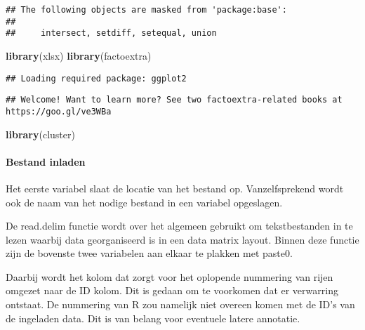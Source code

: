 \documentclass[
]{article}
\newenvironment{Shaded}{\begin{snugshade}}{\end{snugshade}}
\newcommand{\KeywordTok}[1]{\textcolor[rgb]{0.13,0.29,0.53}{\textbf{#1}}}
\newcommand{\NormalTok}[1]{#1}
\begin{document}
\begin{verbatim}
## The following objects are masked from 'package:base':
## 
##     intersect, setdiff, setequal, union
\end{verbatim}

\begin{Shaded}
\begin{Highlighting}[]
\KeywordTok{library}\NormalTok{(xlsx)}
\KeywordTok{library}\NormalTok{(factoextra)}
\end{Highlighting}
\end{Shaded}

\begin{verbatim}
## Loading required package: ggplot2
\end{verbatim}

\begin{verbatim}
## Welcome! Want to learn more? See two factoextra-related books at https://goo.gl/ve3WBa
\end{verbatim}

\begin{Shaded}
\begin{Highlighting}[]
\KeywordTok{library}\NormalTok{(cluster)}
\end{Highlighting}
\end{Shaded}

\hypertarget{bestand-inladen}{%
\paragraph{Bestand inladen}\label{bestand-inladen}}

Het eerste variabel slaat de locatie van het bestand op. Vanzelfsprekend
wordt ook de naam van het nodige bestand in een variabel opgeslagen.

De read.delim functie wordt over het algemeen gebruikt om tekstbestanden
in te lezen waarbij data georganiseerd is in een data matrix layout.
Binnen deze functie zijn de bovenste twee variabelen aan elkaar te
plakken met paste0.

Daarbij wordt het kolom dat zorgt voor het oplopende nummering van rijen
omgezet naar de ID kolom. Dit is gedaan om te voorkomen dat er
verwarring ontstaat. De nummering van R zou namelijk niet overeen komen
met de ID's van de ingeladen data. Dit is van belang voor eventuele
latere annotatie.
\end{document}
